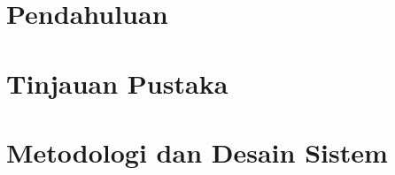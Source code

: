\documentclass[12pt,a4paper,oneside]{report}
\begin{document}
	
		
	
	
	\setcounter{page}{1}	
	
	
	\tableofcontents
	\newpage
	
	
	
	\newpage
	
	
	
	\setcounter{page}{1}
	
	\chapter{Pendahuluan}
	
	
	
	
	
	
	
	
	\chapter{Tinjauan Pustaka}
	
	
	
	
	
	
	
	
	\chapter{Metodologi dan Desain Sistem}
	
	
	
	
	
	
	
	
\end{document}
